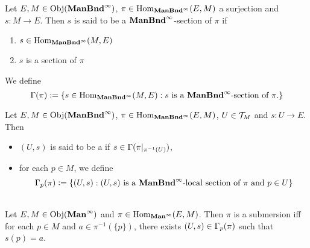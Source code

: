 \documentclass{book}
\begin{document}
	\begin{defn} 
		Let $E, M \in \operatorname{Obj}(\operatorname*{\text{\textbf{ManBnd}}^{\infty}})$, $\pi \in \operatorname{Hom}_{\operatorname*{\text{\textbf{ManBnd}}^{\infty}}}(E, M)$ a surjection and $s: M \rightarrow E$. Then $s$ is said to be a $\operatorname*{\text{\textbf{ManBnd}}^{\infty}}$-section of $\pi$ if 
		\begin{enumerate}
			\item $s \in \operatorname{Hom}_{\operatorname*{\text{\textbf{ManBnd}}^{\infty}}}(M, E)$
			\item $s$ is a section of $\pi$
		\end{enumerate}
		We define $$\Gamma(\pi) \vcentcolon= \{s \in \operatorname{Hom}_{\operatorname*{\text{\textbf{ManBnd}}^{\infty}}}(M, E): \text{$s$ is a $\operatorname*{\text{\textbf{ManBnd}}^{\infty}}$-section of $\pi$.}\}$$
	\end{defn}
	
	\begin{defn} 
		Let $E, M \in \operatorname{Obj}(\operatorname*{\text{\textbf{ManBnd}}^{\infty}})$, $\pi \in \operatorname{Hom}_{\operatorname*{\text{\textbf{ManBnd}}^{\infty}}}(E, M)$, $U \in \mathcal{T}_M$ and $s : U \rightarrow E$. Then 
		\begin{itemize}
			\item $(U, s)$ is said to be a  if $s \in \Gamma(\pi|_{\pi^{-1}(U)})$, 
			\item for each $p \in M$, we define 
			$$\Gamma_p(\pi) \vcentcolon= \{(U, s): \text{$(U, s)$ is a $\operatorname*{\text{\textbf{ManBnd}}^{\infty}}$-local section of $\pi$ and $p \in U$}\}$$
		\end{itemize}
	\end{defn}

	\begin{ex}   \\
		Let $E, M \in \operatorname{Obj}(\operatorname*{\text{\textbf{Man}}^{\infty}})$ and $\pi \in \operatorname{Hom}_{\operatorname*{\text{\textbf{Man}}^{\infty}}}(E, M)$. Then $\pi$ is a submersion iff for each $p \in M$ and $a \in \pi^{-1}(\{p\})$, there exists $(U, s) \in \Gamma_p(\pi)$ such that $s(p) = a$.
	\end{ex}
\end{document}
